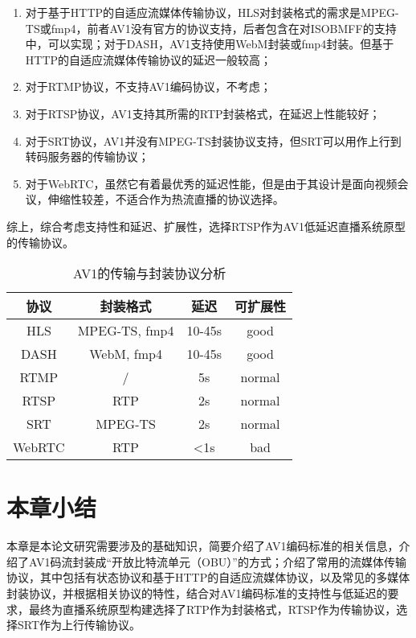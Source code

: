 \begin{enumerate} [label=\arabic*)]
  \item 对于基于HTTP的自适应流媒体传输协议，HLS对封装格式的需求是MPEG-TS或fmp4，前者AV1没有官方的协议支持，后者包含在对ISOBMFF的支持中，可以实现；对于DASH，AV1支持使用WebM封装或fmp4封装。但基于HTTP的自适应流媒体传输协议的延迟一般较高；
  \item 对于RTMP协议，不支持AV1编码协议，不考虑；
  \item 对于RTSP协议，AV1支持其所需的RTP封装格式，在延迟上性能较好；
  \item 对于SRT协议，AV1并没有MPEG-TS封装协议支持，但SRT可以用作上行到转码服务器的传输协议；
  \item 对于WebRTC，虽然它有着最优秀的延迟性能，但是由于其设计是面向视频会议，伸缩性较差，不适合作为热流直播的协议选择。
\end{enumerate}

综上，综合考虑支持性和延迟、扩展性，选择RTSP作为AV1低延迟直播系统原型的传输协议。

\begin{table}[!hpt]
  \caption{AV1的传输与封装协议分析}
  \label{tab:protocol}
  \centering
  \begin{tabular}{cccc} \toprule
    协议     & 封装格式       & 延迟     & 可扩展性\\ \midrule
    HLS     & MPEG-TS, fmp4 & 10-45s  & good  \\
    DASH    & WebM, fmp4    & 10-45s  & good  \\
    RTMP    & /             & 5s      & normal \\
    RTSP    & RTP           & 2s      & normal \\
    SRT     & MPEG-TS       & 2s      & normal \\
    WebRTC  & RTP           & <1s     & bad    \\ \bottomrule
  \end{tabular}
\end{table}




\section{本章小结}

本章是本论文研究需要涉及的基础知识，简要介绍了AV1编码标准的相关信息，介绍了AV1码流封装成“开放比特流单元（OBU）”的方式；介绍了常用的流媒体传输协议，其中包括有状态协议和基于HTTP的自适应流媒体协议，以及常见的多媒体封装协议，并根据相关协议的特性，结合对AV1编码标准的支持性与低延迟的要求，最终为直播系统原型构建选择了RTP作为封装格式，RTSP作为传输协议，选择SRT作为上行传输协议。
